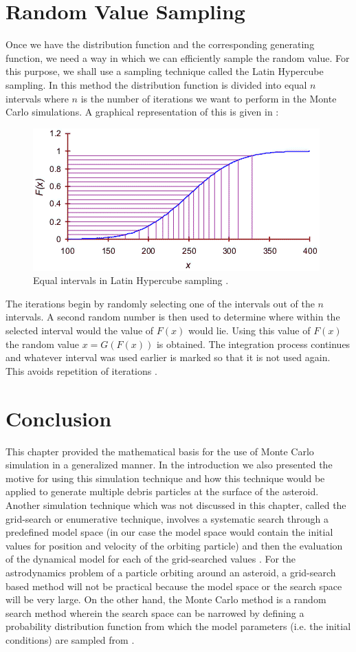 \section{Random Value Sampling}
Once we have the distribution function and the corresponding generating function, we need a way in which we can efficiently sample the random value. For this purpose, we shall use a sampling technique called the Latin Hypercube sampling. In this method the distribution function is divided into equal $n$ intervals where $n$ is the number of iterations we want to perform in the Monte Carlo simulations. A graphical representation of this is given in  \cite{monteweb}:
%
\begin{figure}[h]
\centering
\captionsetup{justification=centering}
\includegraphics[scale=1]{lhs.png}
\caption{Equal intervals in Latin Hypercube sampling \cite{monteweb}.}
\label{fig:lhs}
\end{figure}
\FloatBarrier
%
The iterations begin by randomly selecting one of the intervals out of the $n$ intervals. A second random number is then used to determine where within the selected interval would the value of $F(x)$ would lie. Using this value of $F(x)$ the random value $x = G(F(x))$ is obtained. The integration process continues and whatever interval was used earlier is marked so that it is not used again. This avoids repetition of iterations \cite{monteweb}.

\section{Conclusion}
This chapter provided the mathematical basis for the use of Monte Carlo simulation in a generalized manner. In the introduction we also presented the motive for using this simulation technique and how this technique would be applied to generate multiple debris particles at the surface of the asteroid. Another simulation technique which was not discussed in this chapter, called the grid-search or enumerative technique, involves a systematic search through a predefined model space (in our case the model space would contain the initial values for position and velocity of the orbiting particle) and then the evaluation of the dynamical model for each of the grid-searched values \cite{grid_monte}. For the astrodynamics problem of a particle orbiting around an asteroid, a grid-search based method will not be practical because the model space or the search space will be very large. On the other hand, the Monte Carlo method is a random search method wherein the search space can be narrowed by defining a probability distribution function from which the model parameters (i.e. the initial conditions) are sampled from \cite{grid_monte}.

